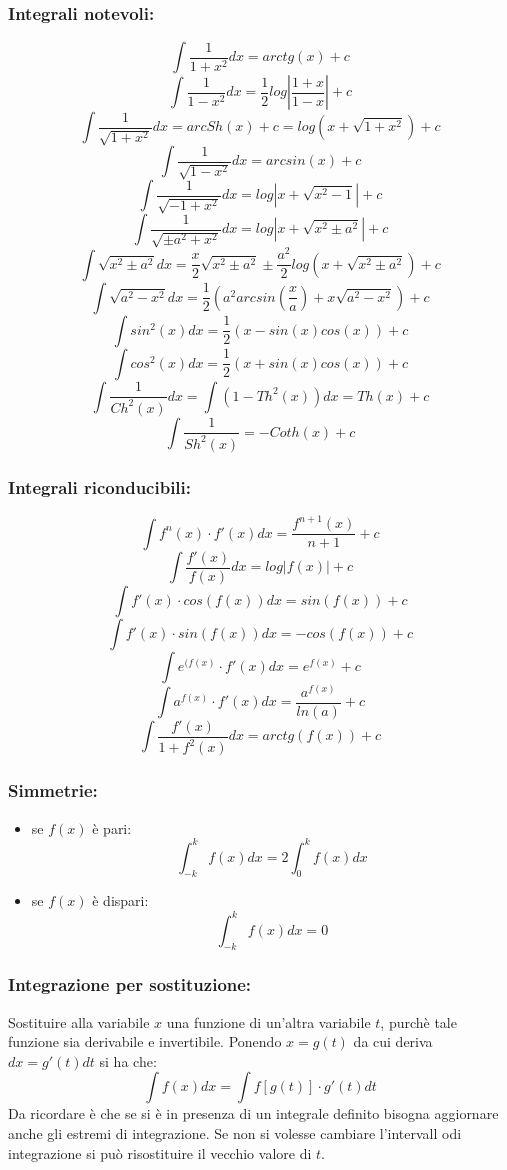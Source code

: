 \documentclass[a4paper, 9pt]{report}
\begin{document}
\subsubsection*{Integrali notevoli:}
\[
    \int \frac{1}{1+x^2} dx = arctg(x) +c
\]
\[
    \int \frac{1}{1-x^2} dx = \frac{1}{2}log\left|\frac{1+x}{1-x}\right|+c
\]
\[
    \int \frac{1}{\sqrt{1+x^2}} dx = arcSh(x) +c = log(x + \sqrt{1+x^2}) +c
\]
\[
    \int \frac{1}{\sqrt{1-x^2}} dx = arcsin(x) +c
\]
\[
    \int \frac{1}{\sqrt{-1 + x^2}} dx = log|x+ \sqrt{x^2-1}| +c
\]
\[
    \int \frac{1}{\sqrt{\pm a^2 + x^2}} dx = log|x + \sqrt{x^2 \pm a^2}|+c
\]
\[
    \int \sqrt{x^2 \pm a^2} dx = \frac{x}{2} \sqrt{x^2 \pm a^2} \pm \frac{a^2}{2} log(x + \sqrt{x^2 \pm a^2}) +c
\]
\[
    \int \sqrt{a^2 - x^2}dx = \frac{1}{2}(a^2arcsin(\frac{x}{a}) + x \sqrt{a^2 - x^2} )+c
\]
\[
    \int sin^2(x) dx = \frac{1}{2}(x-sin(x)cos(x)) +c
\]
\[
    \int cos^2(x) dx = \frac{1}{2}(x+sin(x)cos(x)) +c
\]
\[
    \int \frac{1}{Ch^2(x)} dx = \int (1-Th^2(x))dx= Th(x)+c
\]
\[
    \int \frac{1}{Sh^2(x)} = -Coth(x) +c
\]
\subsubsection*{Integrali riconducibili:}
\[
    \int f^n(x) \cdot f'(x) dx = \frac{f^{n+1}(x)}{n+1} +c
\]
\[
    \int \frac{f'(x)}{f(x)} dx = log|f(x)|+c
\]
\[
    \int f'(x) \cdot cos(f(x)) dx =  sin(f(x))+c
\]
\[
    \int f'(x) \cdot sin(f(x)) dx = -cos(f(x)) +c
\]
\[
    \int e^{(f(x)} \cdot f'(x) dx = e^{f(x)}+c
\]
\[
    \int a^{f(x)} \cdot f'(x) dx = \frac{a^{f(x)}}{ln(a)} +c
\]
\[
    \int \frac{f'(x)}{1+f^2(x)} dx = arctg(f(x))+c
\]
\subsubsection*{Simmetrie:}
\begin{itemize}
    \item se $f(x)$ è pari:
    \[
        \int_{-k}^{k}f(x)dx = 2 \int_{0}^{k} f(x) dx
    \]
    \item se $f(x)$ è dispari:
    \[
        \int_{-k}^{k}f(x)dx = 0
    \]
\end{itemize}
\subsubsection*{Integrazione per sostituzione:}
Sostituire alla variabile $x$ una funzione di un'altra variabile $t$, purchè tale funzione sia derivabile e invertibile.\newline
Ponendo $x = g(t)$ da cui deriva $dx = g'(t) dt$ si ha che:
\[
    \int f(x) dx = \int f[g(t)] \cdot g'(t) dt
\]
Da ricordare è che se si è in presenza di un integrale definito bisogna aggiornare anche gli estremi di integrazione. Se non si volesse cambiare l'intervall odi integrazione si può risostituire il vecchio valore di $t$.
\end{document}

